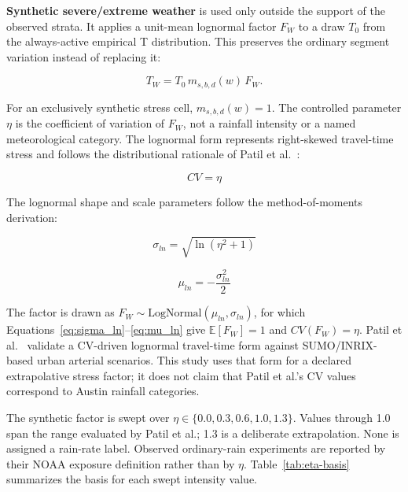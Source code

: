 \textbf{Synthetic severe/extreme weather} is used only outside the support of the observed strata. It applies a unit-mean lognormal factor $F_W$ to a draw $T_0$ from the always-active empirical T distribution. This preserves the ordinary segment variation instead of replacing it:

\begin{equation}
T_W = T_0\,m_{s,b,d}(w)\,F_W.
\label{eq:weather-compose}
\end{equation}

For an exclusively synthetic stress cell, $m_{s,b,d}(w)=1$. The controlled parameter $\eta$ is the coefficient of variation of $F_W$, not a rainfall intensity or a named meteorological category. The lognormal form represents right-skewed travel-time stress and follows the distributional rationale of Patil et al.~\cite{Patil2025Conformal}:

\begin{equation} CV = \eta \label{eq:cv_eta} \end{equation}

The lognormal shape and scale parameters follow the method-of-moments derivation:

\begin{equation} \sigma_{ln} = \sqrt{\ln(\eta^2 + 1)} \label{eq:sigma_ln} \end{equation}

\begin{equation} \mu_{ln} = -\frac{\sigma_{ln}^2}{2} \label{eq:mu_ln} \end{equation}

The factor is drawn as $F_W \sim \text{LogNormal}(\mu_{ln},\sigma_{ln})$, for which Equations~\eqref{eq:sigma_ln}--\eqref{eq:mu_ln} give $\mathbb{E}[F_W]=1$ and $CV(F_W)=\eta$. Patil et al.~\cite{Patil2025Conformal} validate a CV-driven lognormal travel-time form against SUMO/INRIX-based urban arterial scenarios. This study uses that form for a declared extrapolative stress factor; it does not claim that Patil et al.'s CV values correspond to Austin rainfall categories.

The synthetic factor is swept over $\eta \in \{0.0,0.3,0.6,1.0,1.3\}$. Values through 1.0 span the range evaluated by Patil et al.; 1.3 is a deliberate extrapolation. None is assigned a rain-rate label. Observed ordinary-rain experiments are reported by their NOAA exposure definition rather than by $\eta$. Table~\ref{tab:eta-basis} summarizes the basis for each swept intensity value.

